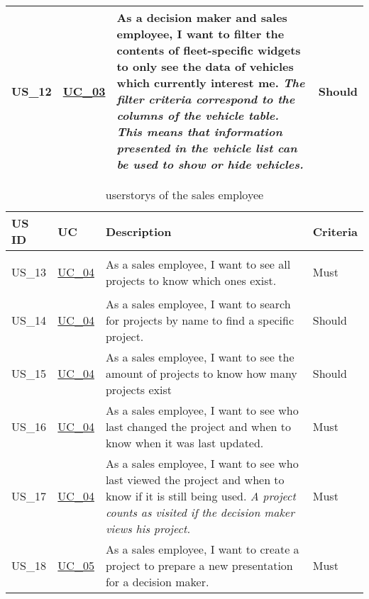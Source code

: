 \begin{footnotesize}
\begin{longtable}[L L L L]{ p{} p{} p{} p{}}
      \rowcolor{Gray}
      \hypertarget{Ref:US12}{US\_12} & \hyperlink{Ref:UC3}{UC\_03} & As a decision maker and sales employee, I want to filter the contents of fleet-specific \glspl{widget} to only see the data of vehicles which currently interest me.
      \newline
      \emph{The filter criteria correspond to the columns of the vehicle table. This means that information presented in the vehicle list can be used to show or hide vehicles.}
      & Should \\

      \bottomrule
    \end{longtable}
  \end{footnotesize}
  \rmfamily

  \sffamily
  \begin{footnotesize}
    \begin{longtable}[L L L L]{ p{} p{} p{} p{} }
      \caption                       %
          {\Glspl{userstory} of the sales employee} %
          \\
      \toprule
      \textbf{US ID} & \textbf{UC} & \textbf{Description} & \textbf{Criteria} \\
      \midrule
      \hypertarget{Ref:US13}{US\_13} & \hyperlink{Ref:UC4}{UC\_04} & As a sales employee, I want to see all projects to know which ones exist. & Must \\
      \hypertarget{Ref:US14}{US\_14} & \hyperlink{Ref:UC4}{UC\_04} & As a sales employee, I want to search for projects by name to find a specific project. & Should \\
      \hypertarget{Ref:US15}{US\_15} & \hyperlink{Ref:UC4}{UC\_04} & As a sales employee, I want to see the amount of projects to know how many projects exist & Should \\
      \hypertarget{Ref:US16}{US\_16} & \hyperlink{Ref:UC4}{UC\_04} & As a sales employee, I want to see who last changed the project and when to know when it was last updated. & Must \\
      \hypertarget{Ref:US17}{US\_17} & \hyperlink{Ref:UC4}{UC\_04} & As a sales employee, I want to see who last viewed the project and when to know if it is still being used.
      \newline
      \emph{A project counts as visited if the decision maker views his project.} & Must \\
      \hypertarget{Ref:US18}{US\_18} & \hyperlink{Ref:UC5}{UC\_05} & As a sales employee, I want to create a project to prepare a new presentation for a decision maker. & Must \\

\end{longtable}
\end{footnotesize}
